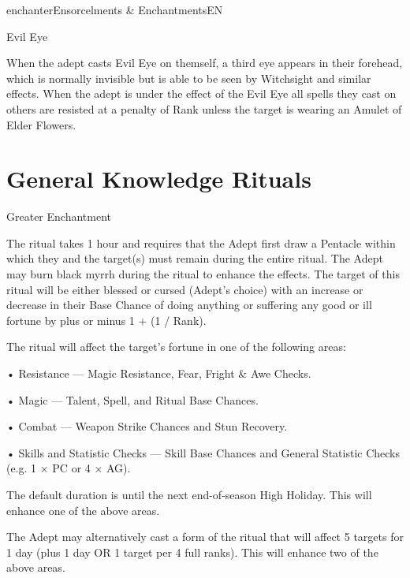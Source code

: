 \begin{College}[1.1]{enchanter}{Ensorcelments \& Enchantments}{EN}
\begin{spell}[G-9]{Evil Eye}

\begin{effects}
When the adept casts Evil Eye on themself, a third eye appears in
their forehead, which is normally invisible but is able to be seen by
Witchsight and similar effects.  When the adept is under the effect of
the Evil Eye all spells they cast on others are resisted at a penalty
of Rank unless the target is wearing an Amulet of Elder Flowers.
\end{effects}
\end{spell}

\section{General Knowledge Rituals}

\begin{ritual}[Q-1]{Greater Enchantment}

\begin{effects}
The ritual takes 1 hour and requires that the Adept first draw a
Pentacle within which they and the target(s) must remain during the
entire ritual. The Adept may burn black myrrh during the ritual to
enhance the effects.  The target of this ritual will be either blessed
or cursed (Adept’s choice) with an increase or decrease in their Base
Chance of doing anything or suffering any good or ill fortune by plus
or minus 1 + (1 / Rank).

The ritual will affect the target’s fortune in one of 
the following areas:  

• Resistance — Magic Resistance, Fear, Fright \& Awe Checks.

• Magic — Talent, Spell, and Ritual Base Chances.

• Combat — Weapon Strike Chances and Stun Recovery.

• Skills and Statistic Checks — Skill Base Chances and General
Statistic Checks (e.g.  1 × PC or 4 × AG).

The default duration is until the next end-of-season High Holiday.
This will enhance one of the above areas.

The Adept may alternatively cast a form of the ritual that will affect
5 targets for 1 day (plus 1 day OR 1 target per 4 full ranks).  This
will enhance two of the above areas.


\end{effects}
\end{ritual}
\end{College}
